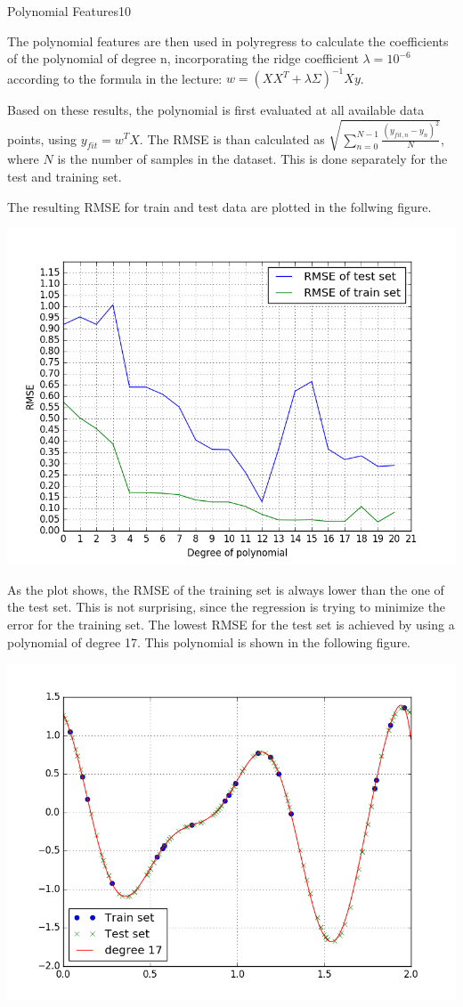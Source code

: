 \begin{questions}
\begin{question}{Polynomial Features}{10}
\begin{answer}
The polynomial features are then used in polyregress to calculate the coefficients of the polynomial of degree n, incorporating the ridge coefficient $\lambda = 10^{-6}$ according to the formula in the lecture: $w=(XX^T+ \lambda \Sigma)^{-1}Xy$.



Based on these results, the polynomial is first evaluated at all available data points, using $y_{fit} = w^TX$. The RMSE is than calculated as $\sqrt{\sum_{n=0}^{N-1}\frac{ (y_{fit,n}-y_n)^2}{N}}$, where $N$ is the number of samples in the dataset. This is done separately for the test and training set.



The resulting RMSE for train and test data are plotted in the follwing figure.

\centering \includegraphics[width=0.7\linewidth]{img/31a_ridge}

As the plot shows, the RMSE of the training set is always lower than the one of the test set. This is not surprising, since the regression is trying to minimize the error for the training set. The lowest RMSE for the test set is achieved by using a polynomial of degree 17. This polynomial is shown in the following figure.

\centering \includegraphics[width=0.7\linewidth]{img/31a2}


\end{answer}
\end{question}
\end{questions}
